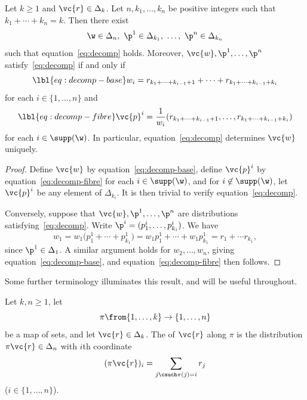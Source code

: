 \begin{lemma}
Let $k \geq 1$ and $\vc{r} \in \Delta_k$.  Let $n, k_1, \ldots, k_n$ be
positive integers such that $k_1 + \cdots + k_n = k$.  Then there exist 
\[
\w \in \Delta_n, 
\ 
\p^1 \in \Delta_{k_1}, \ 
\ldots, \ 
\p^n \in \Delta_{k_n}
\]
such that equation~\eqref{eq:decomp} holds.  Moreover, $\vc{w}, \p^1,
\ldots, \p^n$ satisfy~\eqref{eq:decomp} if and only if
% 
\begin{equation}
\lbl{eq:decomp-base}
w_i 
=
r_{k_1 + \cdots + k_{i - 1} + 1} 
+ \cdots + 
r_{k_1 + \cdots + k_{i - 1} + k_i}
\end{equation}
% 
for each $i \in \{1, \ldots, n\}$ and 
% 
\begin{equation}
\lbl{eq:decomp-fibre}
\vc{p}^i
=
\frac{1}{w_i} 
(r_{k_1 + \cdots + k_{i - 1} + 1}, \ldots, 
r_{k_1 + \cdots + k_{i - 1} + k_i})
\end{equation}
% 
for each $i \in \supp(\w)$.  In particular, equation~\eqref{eq:decomp}
determines $\vc{w}$ uniquely.
\end{lemma}

\begin{proof}
Define $\vc{w}$ by equation~\eqref{eq:decomp-base}, define
$\vc{p}^i$ by equation~\eqref{eq:decomp-fibre} for each $i \in \supp(\w)$,
and for $i \not\in \supp(\w)$, let $\vc{p}^i$ be any element of
$\Delta_{k_i}$.  It is then trivial to verify equation~\eqref{eq:decomp}.

Conversely, suppose that $\vc{w}, \p^1, \ldots, \p^n$ are distributions
satisfying~\eqref{eq:decomp}.  Write 
$\p^i = (p^i_1, \ldots, p^i_{k_i})$.  We have 
\[
w_1 
= 
w_1 \bigl(p^1_1 + \cdots + p^1_{k_1}\bigr)
=
w_1 p^1_1 + \cdots + w_1 p^1_{k_1}
=
r_1 + \cdots r_{k_1},
\]
since $\p^1 \in \Delta_1$.  A similar argument holds for $w_2, \ldots,
w_n$, giving equation~\eqref{eq:decomp-base}, and
equation~\eqref{eq:decomp-fibre} then follows.
\end{proof}

Some further terminology illuminates this result, and will be
useful throughout.

\begin{defn}
Let $k, n \geq 1$, let 
\[
\pi \from \{1, \ldots, k\} \to \{1, \ldots, n\}
\]
be a map of sets, and let $\vc{r} \in \Delta_k$.  The
\demph{pushforward}\index{pushforward} of $\vc{r}$ along $\pi$ is the
distribution $\pi\vc{r} \in \Delta_n$ with $i$th coordinate
\[
(\pi\vc{r})_i
=
\sum_{j \csuch \pi(j) = i} r_j
\]
($i \in \{1, \ldots, n\}$). 
\end{defn}

